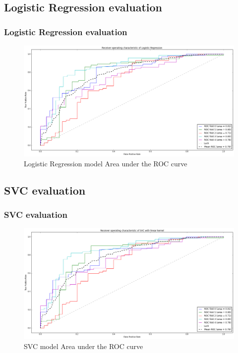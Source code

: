 \documentclass[10pt,handout,english]{beamer}
\begin{document}
		\subsection{Logistic Regression evaluation}
		\begin{frame}
		\frametitle{Logistic Regression evaluation}
		\begin{figure}[h!]
        	\centering
            \includegraphics[width=\textwidth]{log_reg.png}
            \caption{Logistic Regression model Area under the ROC curve}
		\end{figure}
		\end{frame}

		\subsection{SVC evaluation}
		\begin{frame}
		\frametitle{SVC evaluation}
		\begin{figure}[h!]
        	\centering
            \includegraphics[width=\textwidth]{SVC.png}
            \caption{SVC model Area under the ROC curve}
		\end{figure}
		\end{frame}
\end{document}
